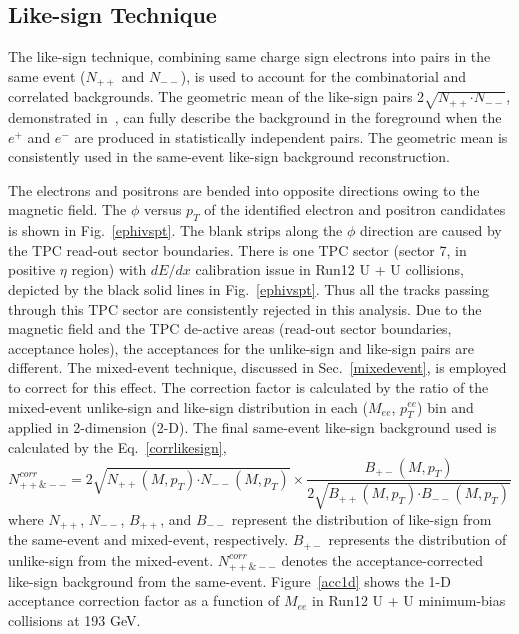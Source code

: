 \subsection{Like-sign Technique}
\label{likesign}

The like-sign technique, combining same charge sign electrons into pairs in the same event ($N_{++}$ and $N_{--}$), is used to account for the combinatorial and correlated backgrounds. The geometric mean of the like-sign pairs 2$\sqrt{N_{++} \bm\cdot N_{--}}$, demonstrated  in~\cite{PHENIX:dielectron0}, can fully describe the background in the foreground when the $e^{+}$ and $e^{-}$ are produced in statistically independent pairs. The geometric mean is consistently used in the same-event like-sign background reconstruction. 


The electrons and positrons are bended into opposite directions owing to the magnetic field. The $\phi$ versus $p_{T}$ of the identified electron and positron candidates is shown in Fig.~\ref{ephivspt}. The blank strips along the $\phi$ direction are caused by the TPC read-out sector boundaries. There is one TPC sector (sector 7, in positive $\eta$ region) with $dE/dx$ calibration issue in Run12 U + U collisions, depicted by the black solid lines in Fig.~\ref{ephivspt}. Thus all the tracks passing through this TPC sector are consistently rejected in this analysis. Due to the magnetic field and the TPC de-active areas (read-out sector boundaries, acceptance holes), the acceptances for the unlike-sign and like-sign pairs are different. The mixed-event technique, discussed in Sec.~\ref{mixedevent}, is employed to correct for this effect. The correction factor is calculated by the ratio of the mixed-event unlike-sign and like-sign distribution in each ($M_{ee}$, $p_{T}^{ee}$) bin and applied in 2-dimension (2-D). The final same-event like-sign background used is calculated by the Eq.~\ref{corrlikesign}, 
\begin{equation}
N_{++\&--}^{corr} = 2\sqrt{N_{++}(M, p_{T}) \bm\cdot N_{--}(M,p_{T})} \times \frac{B_{+-}(M,p_{T})}{2\sqrt{B_{++}(M, p_{T}) \bm\cdot B_{--}(M,p_{T})}}
\label{corrlikesign}
\end{equation}
where $N_{++}$, $N_{--}$, $B_{++}$, and $B_{--}$ represent the distribution of like-sign from the same-event and mixed-event, respectively. $B_{+-}$ represents the distribution of unlike-sign from the mixed-event. $N_{++\&--}^{corr}$ denotes the acceptance-corrected like-sign background from the same-event. Figure~\ref{acc1d} shows the 1-D acceptance correction factor as a function of $M_{ee}$ in Run12 U + U minimum-bias collisions at 193 GeV. 

